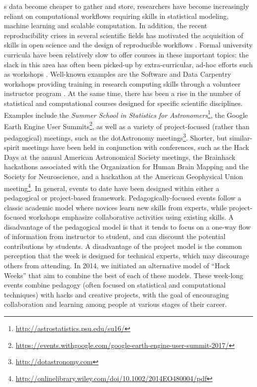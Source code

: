 \label{sec:introduction}
s data become cheaper to gather and store, researchers have become increasingly reliant on computational workflows requiring skills in statistical modeling, machine learning and scalable computation. In addition, the recent reproducibility crises in several scientific fields has motivated the acquisition of skills in open science and the design of reproducible workflows \cite[e.g.][]{pashler2012,baker2016}.
Formal university curricula have been relatively slow to offer courses in these important topics: the slack in this area has often been picked-up by extra-curricular, ad-hoc efforts such as workshops \cite{demasi2017}.
Well-known examples are the Software and Data Carpentry workshops providing training in research computing skills through a volunteer instructor program \cite{b:wilson-swc-lessons-2016,teal2015data}.
At the same time, there has been a rise in the number of statistical and computational courses designed for specific scientific disciplines.
Examples include the \textit{Summer School in Statistics for Astronomers}\footnote{\url{http://astrostatistics.psu.edu/su16/}}, the Google Earth Engine User Summits\footnote{\url{https://events.withgoogle.com/google-earth-engine-user-summit-2017/}}, as well as a variety of project-focused (rather than pedagogical) meetings, such as the dotAstronomy meetings\footnote{\url{http://dotastronomy.com}}.
Shorter, but similar-spirit meetings have been held in conjunction with conferences, such as the Hack Days at the annual American Astronomical Society meetings, the Brainhack hackathons associated with the Organization for Human Brain Mapping and the Society for Neuroscience\cite{Cameron_Craddock2016-wc}, and a hackathon at the American Geophysical Union meeting\footnote{\url{http://onlinelibrary.wiley.com/doi/10.1002/2014EO480004/pdf}}. 
In general, events to date have been designed within either a pedagogical or project-based framework.
Pedagogically-focused events follow a classic academic model where novices learn new skills from experts, while project-focused workshops emphasize collaborative activities using existing skills.
A disadvantage of the pedagogical model is that it tends to focus on a one-way flow of information from instructor to student, and can discount the potential contributions by students.
A disadvantage of the project model is the common perception that the week is designed for technical experts, which may discourage others from attending.
In 2014, we initiated an alternative model of ``Hack Weeks'' that aim to combine the best of each of these models.
These week-long events combine pedagogy (often focused on statistical and computational techniques) with hacks and creative projects, with the goal of encouraging collaboration and learning among people at various stages of their career.

